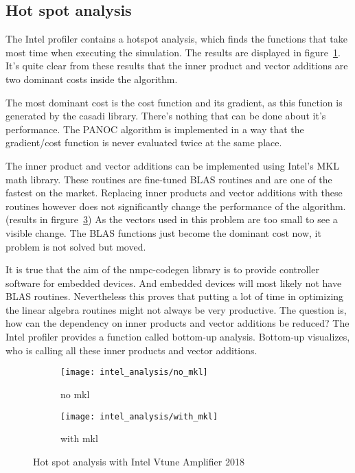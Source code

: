 \subsection{Hot spot analysis}
The Intel profiler contains a hotspot analysis, which finds the functions that take most time when executing the simulation. The results are displayed in figure~\ref{fig:hotspot no mkl}.  It's quite clear from these results that the inner product and vector additions are two dominant costs inside the algorithm.

The most dominant cost is the cost function and its gradient, as this function is generated by the casadi library. There's nothing that can be done about it's performance. The PANOC algorithm is implemented in a way that the gradient/cost function is never evaluated twice at the same place.

The inner product and vector additions can be implemented using Intel's MKL math library. These routines are fine-tuned BLAS routines and are one of the fastest on the market. Replacing inner products and vector additions with these routines however does not significantly change the performance of the algorithm.(results in firgure~\ref{fig:hotspot with mkl}) As the vectors used in this problem are too small to see a visible change. The BLAS functions just become the dominant cost now, it problem is not solved but moved.

It is true that the aim of the nmpc-codegen library is to provide controller software for embedded devices. And embedded devices will most likely not have BLAS routines. Nevertheless this proves that putting a lot of time in optimizing the linear algebra routines might not always be very productive. The question is, how can the dependency on inner products and vector additions be reduced? The Intel profiler provides a function called bottom-up analysis. Bottom-up visualizes, who is calling all these inner products and vector additions.

\begin{figure}[H]
	\centering
	\begin{subfigure}[b]{0.45\textwidth}
		\centering
		\texttt{[image: intel\_analysis/no\_mkl]}
		\caption{no mkl}
		\label{fig:hotspot no mkl}
	\end{subfigure}
	\hfill
	\begin{subfigure}[b]{0.45\textwidth}
		\centering
		\texttt{[image: intel\_analysis/with\_mkl]}
		\caption{with mkl}
		\label{fig:hotspot with mkl}
	\end{subfigure}
	\caption{Hot spot analysis with Intel Vtune Amplifier 2018}
\end{figure}

